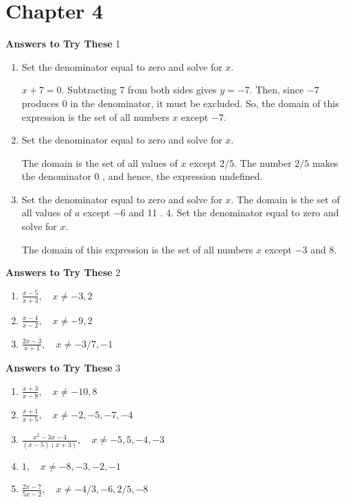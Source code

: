 \documentclass[a4paper]{JAC2003}
\begin{document}
\section{Chapter 4}

\noindent\textcolor{red!75!black}{\textbf{Answers to Try These}} 1
\begin{enumerate}
\item Set the denominator equal to zero and solve for $x$.

$x+7=0 .$ Subtracting 7 from both sides gives $y=-7$. Then, since $-7$ produces 0 in the denominator, it must be excluded. So, the domain of this expression is the set of all numbers $x$ except $-7$.

\item Set the denominator equal to zero and solve for $x$.

The domain is the set of all values of $x$ except $2 / 5$. The number $2 / 5$ makes the denominator 0 , and hence, the expression undefined.

\item Set the denominator equal to zero and solve for $x$. The domain is the set of all values of $a$ except $-6$ and 11 . 4. Set the denominator equal to zero and solve for $x$.

The domain of this expression is the set of all numbers $x$ except $-3$ and 8.
\end{enumerate}

\noindent\textcolor{red!75!black}{\textbf{Answers to Try These}} 2
\begin{enumerate}
\item $\frac{x-5}{x+3}, \quad x \neq-3,2$ %

\item $\frac{x-4}{x-2}, \quad x \neq-9,2$

\item $\frac{2 x-3}{x+1}, \quad x \neq-3 / 7,-1$
\end{enumerate}

\noindent\textcolor{red!75!black}{\textbf{Answers to Try These}} 3
\begin{enumerate}
\item $\frac{x+3}{x-8}, \quad x \neq-10,8$ %

\item $\frac{x+1}{x+5}, \quad x \neq-2,-5,-7,-4$

\item $\frac{x^{2}-3 x-4}{(x-5)(x+3)}, \quad x \neq-5,5,-4,-3$ %

\item $1, \quad x \neq-8,-3,-2,-1$

\item $\frac{2 x-7}{5 x-2}, \quad x \neq-4 / 3,-6,2 / 5,-8$
\end{enumerate}
\end{document}
